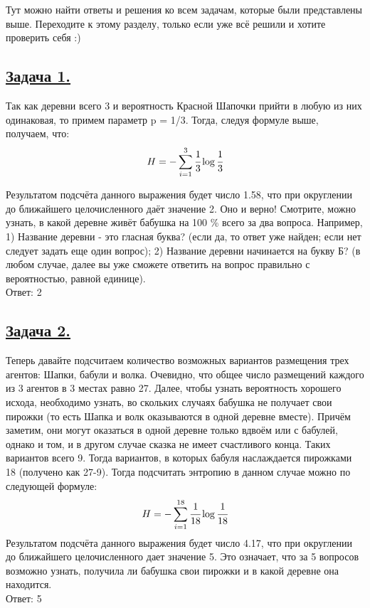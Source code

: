 Тут можно найти ответы и решения ко всем задачам, которые были представлены выше. Переходите к этому разделу, только если уже всё решили и хотите проверить себя :)

\subsection*{\hyperref[sec:problem1]{Задача 1.}}
\label{sec:sol_problem1}
Так как деревни всего 3 и вероятность Красной Шапочки прийти в любую из них одинаковая, то примем параметр p = 1/3. Тогда, следуя формуле выше, получаем, что:
\[H=-\sum\limits_{i=1}^3 \cfrac{1}{3}\log \cfrac{1}{3} \]

Результатом подсчёта данного выражения будет число 1.58, что при округлении до ближайшего целочисленного даёт значение 2. Оно и верно! Смотрите, можно узнать, в какой деревне живёт бабушка на 100 \%  всего за два вопроса. 
Например, 1) Название деревни - это гласная буква? (если да, то ответ уже найден; если нет следует задать еще один вопрос); 2) Название деревни начинается на букву Б? (в любом случае, далее вы уже сможете ответить на вопрос правильно с вероятностью, равной единице). \\

Ответ: 2
\subsection*{\hyperref[sec:problem2]{Задача 2.}}
\label{sec:sol_problem2}
Теперь давайте подсчитаем количество возможных вариантов размещения трех агентов: Шапки, бабули и волка. Очевидно, что общее число размещений каждого из 3 агентов в 3 местах равно 27. 
Далее, чтобы узнать вероятность хорошего исхода, необходимо узнать, во скольких случаях бабушка не получает свои пирожки (то есть Шапка и волк оказываются в одной деревне вместе). Причём заметим, они могут оказаться в одной деревне только вдвоём или с бабулей, однако и том, и в другом случае сказка не имеет счастливого конца. Таких вариантов всего 9. Тогда вариантов, в которых бабуля наслаждается пирожками 18 (получено как 27-9).
Тогда подсчитать энтропию в данном случае можно по следующей формуле:
\[H=-\sum\limits_{i=1}^{18}  \cfrac{1}{18}\log \cfrac{1}{18} \]
Результатом подсчёта данного выражения будет число 4.17, что при округлении до ближайшего целочисленного дает значение 5. Это означает, что за 5 вопросов возможно узнать, получила ли бабушка свои пирожки и в какой деревне она находится. \\ 

Ответ: 5

